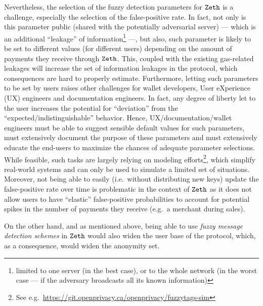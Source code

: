 Nevertheless, the selection of the fuzzy detection parameters for $\texttt{Zeth}$ is a challenge, especially the selection of the false-positive rate.
In fact, not only is this parameter public (shared with the potentially adversarial server) --- which is an additional ``leakage'' of information\footnote{limited to one server (in the best case), or to the whole network (in the worst case --- if the adversary broadcasts all its known information)} ---, but also, such parameter is likely to be set to different values (for different users) depending on the amount of payments they receive through $\texttt{Zeth}$. This, coupled with the existing gas-related leakages will increase the set of information leakages in the protocol, which consequences are hard to properly estimate. Furthermore, letting such parameters to be set by users raises other challenges for wallet developers, User eXperience (UX) engineers and documentation engineers. In fact, any degree of liberty let to the user increases the potential for ``deviation'' from the ``expected/indistinguishable'' behavior. Hence, UX/documentation/wallet engineers must be able to suggest sensible default values for such parameters, must extensively document the purpose of these parameters and must extensively educate the end-users to maximize the chances of adequate parameter selections. While feasible, such tasks are largely relying on modeling efforts\footnote{See e.g.~\url{https://git.openprivacy.ca/openprivacy/fuzzytags-sim}}, which simplify real-world systems and can only be used to simulate a limited set of situations.
Moreover, not being able to easily (i.e.~without distributing new keys) update the false-positive rate over time is problematic in the context of $\texttt{Zeth}$ as it does not allow users to have ``elastic'' false-positive probabilities to account for potential spikes in the number of payments they receive (e.g.~a merchant during sales).

On the other hand, and as mentioned above, being able to use \emph{fuzzy message detection schemes} in $\texttt{Zeth}$ would also widen the user base of the protocol, which, as a consequence, would widen the anonymity set.
